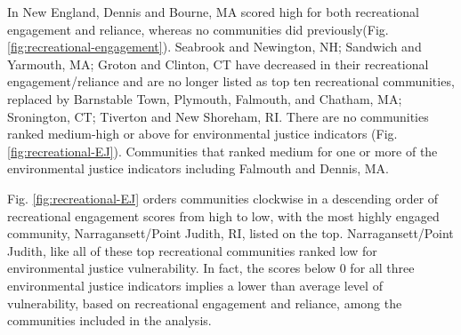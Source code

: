 \documentclass[
  10pt,
]{article}
\begin{document}
In New England, Dennis and Bourne, MA scored high for both recreational engagement and reliance, whereas no communities did previously(Fig.\ref{fig:recreational-engagement}). Seabrook and Newington, NH; Sandwich and Yarmouth, MA; Groton and Clinton, CT have decreased in their recreational engagement/reliance and are no longer listed as top ten recreational communities, replaced by Barnstable Town, Plymouth, Falmouth, and Chatham, MA; Sronington, CT; Tiverton and New Shoreham, RI. There are no communities ranked medium-high or above for environmental justice indicators (Fig. \ref{fig:recreational-EJ}). Communities that ranked medium for one or more of the environmental justice indicators including Falmouth and Dennis, MA.

Fig. \ref{fig:recreational-EJ} orders communities clockwise in a descending order of recreational engagement scores from high to low, with the most highly engaged community, Narragansett/Point Judith, RI, listed on the top. Narragansett/Point Judith, like all of these top recreational communities ranked low for environmental justice vulnerability. In fact, the scores below 0 for all three environmental justice indicators implies a lower than average level of vulnerability, based on recreational engagement and reliance, among the communities included in the analysis.
\end{document}
